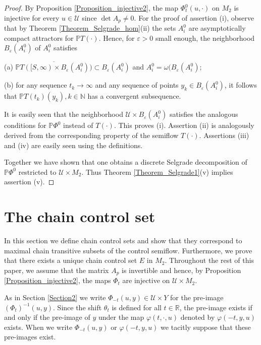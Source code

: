 \documentclass{siamltex}%
\begin{document}
\begin{proof}
By Proposition \ref{Proposition_injective2}, the map $\Phi_{t}^{0}(u,\cdot)$
on $M_{2}$ is injective for every $u\in\mathcal{U}$ since $\det A_{p}\not =0$.
For the proof of assertion (i), observe that by Theorem
\ref{Theorem_Selgrade_hom}(ii) the sets $A_{i}^{0}$ are asymptotically compact
attractors for $\mathbb{P}T(\cdot)$. Hence, for $\varepsilon>0$ small enough,
the neighborhood $B_{\varepsilon}(A_{i}^{0})$ of $A_{i}^{0}$ satisfies

(a) $\overline{\mathbb{P}T([S,\infty)\times B_{\varepsilon}(A_{i}^{0}%
))}\subset B_{\varepsilon}(A_{i}^{0})$ and $A_{i}^{0}=\omega(B_{\varepsilon
}(A_{i}^{0})$;

(b) for any sequence $t_{k}\rightarrow\infty$ and any sequence of points
$y_{k}\in B_{\varepsilon}(A_{i}^{0})$, it follows that $\mathbb{P}%
T(t_{k})(y_{k}),k\in\mathbb{N}$ has a convergent subsequence.

It is easily seen that the neighborhood $\mathcal{U}\times B_{\varepsilon
}(A_{i}^{0})$ satisfies the analogous conditions for $\mathbb{P}\Phi^{0}$
instead of $T(\cdot)$. This proves (i). Assertion (ii) is analogously derived
from the corresponding property of the semiflow $T(\cdot)$. Assertions (iii)
and (iv) are easily seen using the definitions.

Together we have shown that one obtains a discrete Selgrade decomposition of
$\mathbb{P}\Phi^{0}$ restricted to $\mathcal{U}\times M_{2}$. Thus Theorem
\ref{Theorem_Selgrade1}(v) implies assertion (v).
\end{proof}

\section{The chain control set\label{Section5}}

In this section we define chain control sets and show that they correspond to
maximal chain transitive subsets of the control semiflow. Furthermore, we
prove that there exists a unique chain control set $E$ in $M_{2}$. Throughout
the rest of this paper, we assume that the matrix $A_{p}$ is invertible and
hence, by Proposition \ref{Proposition_injective2}, the maps $\Phi_{t}$ are
injective on $\mathcal{U}\times M_{2}$.

As in Section \ref{Section2} we write $\Phi_{-t}(u,y)\in\mathcal{U}\times Y$
for the pre-image $\left(  \Phi_{t}\right)  ^{-1}(u,y)$. Since the shift
$\theta_{t}$ is defined for all $t\in\mathbb{R}$, the pre-image exists if and
only if the pre-image of $y$ under the map $\varphi(t,\cdot,u)$ denoted by
$\varphi(-t,y,u)$ exists. When we write $\Phi_{-t}(u,y)$ or $\varphi(-t,y,u)$
we tacitly suppose that these pre-images exist.
\end{document}
